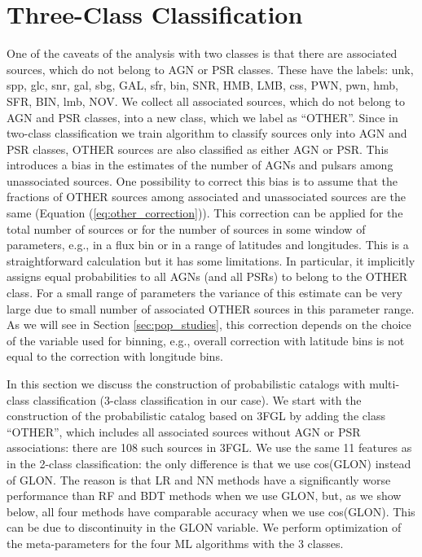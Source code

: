 \section{Three-Class Classification}

One of the caveats of the analysis with two classes is that there are associated sources, which do not belong to AGN or PSR classes. These have the labels: unk, spp, glc, snr, gal, sbg, GAL, sfr, bin, SNR, HMB, LMB, css, PWN, pwn, hmb, SFR, BIN, lmb, NOV.
We collect all associated sources, which do not belong to AGN and PSR classes, into a new class, which we label as ``OTHER''.
Since in two-class classification we train algorithm to classify sources only into AGN and PSR classes, OTHER sources are also classified as either AGN or PSR.
This introduces a bias in the estimates of the number of AGNs and pulsars among unassociated sources.
One possibility to correct this bias is to assume that the fractions of OTHER sources among associated and unassociated sources are the same (Equation (\ref{eq:other_correction})).
This correction can be applied for the total number of sources or for the number of sources in some window of parameters,
e.g., in a flux bin or in a range of latitudes and longitudes.
This is a straightforward calculation but it has some limitations. In particular, it implicitly assigns equal probabilities to all AGNs (and all PSRs) to belong to the OTHER class.
For a small range of parameters the variance of this estimate can be very large due to small number of associated OTHER sources in this parameter range.
As we will see in Section \ref{sec:pop_studies}, this correction depends on the choice of the variable used for binning, e.g.,
overall correction with latitude bins is not equal to the correction with longitude bins.

In this section we discuss the construction of probabilistic catalogs with multi-class classification (3-class classification in our case).
We start with the construction of the probabilistic catalog based on 3FGL by adding the class ``OTHER'', which includes all associated sources without AGN or PSR associations: there are 108 such sources in 3FGL.
We use the same 11 features as in the 2-class classification: the only difference is that we use cos(GLON) instead of GLON.
The reason is that LR and NN methods have a significantly worse performance than RF and BDT methods when we use GLON,
but, as we show below, all four methods have comparable accuracy when we use cos(GLON).
This can be due to discontinuity in the GLON variable. 
We perform optimization of the meta-parameters for the four ML algorithms with the 3 classes.


